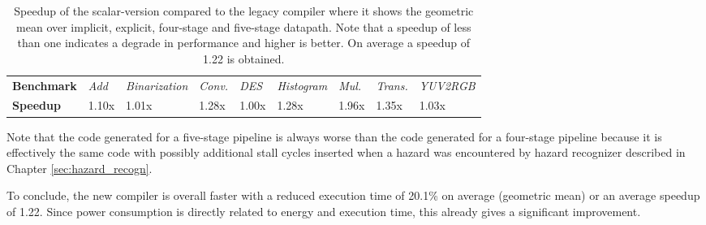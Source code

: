 \begin{table}[t!]
\caption{Speedup of the scalar-version compared to the legacy compiler where it shows the geometric mean over implicit, explicit, four-stage and five-stage datapath. Note that a speedup of less than one indicates a degrade in performance and higher is better. On average a speedup of 1.22 is obtained.}
\begin{center}
\begin{tabular}{@{}l | l l l l l l l l @{}}
\toprule
\textbf{Benchmark} 	& \emph{Add} & \emph{Binarization} & \emph{Conv.} & \emph{DES} & \emph{Histogram} & \emph{Mul.} & \emph{Trans.} & \emph{YUV2RGB}\\
\textbf{Speedup} 	& 1.10x & 1.01x & 1.28x & 1.00x & 1.28x & 1.96x & 1.35x & 1.03x\\
\bottomrule
\end{tabular}
\end{center}
\label{table:scalar_speedup}
\end{table}%



Note that the code generated for a five-stage pipeline is always worse than the code generated for a four-stage pipeline because it is effectively the same code with possibly additional stall cycles inserted when a hazard was encountered by hazard recognizer described in Chapter \ref{sec:hazard_recogn}.

To conclude, the new compiler is overall faster with a reduced execution time of 20.1\% on average (geometric mean) or an average speedup of 1.22. Since power consumption is directly related to energy and execution time, this already gives a significant improvement. \\


